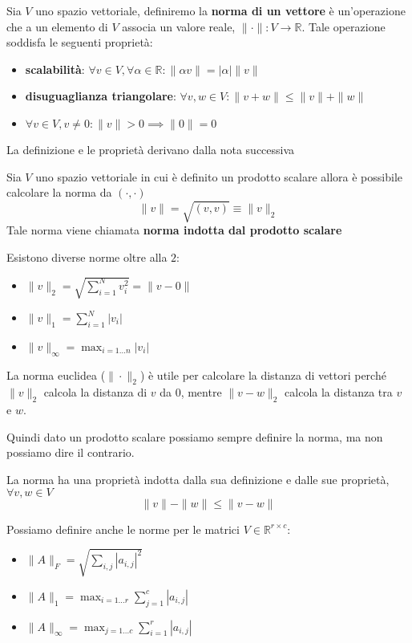 \begin{definizione} 
    Sia $V$ uno spazio vettoriale, definiremo la \textbf{norma di un vettore} è
    un'operazione che a un elemento di $V$ associa un valore reale, $\|\cdot\|:
        V \rightarrow \mathbb{R}$. Tale operazione soddisfa le seguenti proprietà:
    \begin{itemize}
        \item \textbf{scalabilità}: $\forall v \in V,\forall \alpha \in \mathbb{R}:
                  \|\alpha v\| = |\alpha | \|v\|$
        \item \textbf{disuguaglianza triangolare}: $\forall v,w \in V: \|v+w\|
                  \le \|v\| + \|w\|$
        \item $\forall v \in V, v\ne 0: \|v\| > 0\implies \|0\| = 0$
    \end{itemize}
\end{definizione}
La definizione e le proprietà derivano dalla nota successiva
\begin{nota} 
    Sia $V$ uno spazio vettoriale in cui è definito un prodotto scalare allora è
    possibile calcolare la norma da $(\cdot, \cdot)$
    \begin{equation}
        \|v\| = \sqrt{(v,v)}  \equiv \|v\|_2
    \end{equation}
    Tale norma viene chiamata \textbf{norma indotta dal prodotto scalare }
\end{nota}
\begin{nota}
    Esistono diverse norme oltre alla $2$:
    \begin{itemize}
        \item $\|v\|_2 = \sqrt{\sum_{i=1}^{N}v_i^2} = \|v-0\|$
        \item $\|v\|_1 = \sum_{i=1}^{N}|v_i|$
        \item $\|v\|_\infty = \max_{i= 1\dots n}|v_i|$
    \end{itemize}
\end{nota}
La norma euclidea ($\|\cdot\|_2$) è utile per calcolare la distanza di vettori
perché $\|v\|_2$ calcola la distanza di $v$ da $0$, mentre $\|v-w\|_2$ calcola
la distanza tra $v$ e $w$.

Quindi dato un prodotto scalare possiamo sempre definire la norma, ma non possiamo
dire il contrario.
\begin{nota}
    La norma ha una proprietà indotta dalla sua definizione e dalle sue proprietà,
    $\forall v,w \in V$
    \begin{equation*}
        \|v\| -\|w\| \le \|v-w\|
    \end{equation*}
\end{nota}
Possiamo definire anche le norme per le matrici $V\in \mathbb{R}^{r\times c}$:
\begin{itemize}
    \item $\|A\|_F = \sqrt{\sum_{i,j} |a_{i,j}|^2}$
    \item $\|A\|_1 = \max_{i=1\dots r}{\sum_{j=1}^{c} |a_{i,j}|}$
    \item $\|A\|_\infty = \max_{j=1\dots c}{\sum_{i=1}^{r} |a_{i,j}|}$
\end{itemize}

